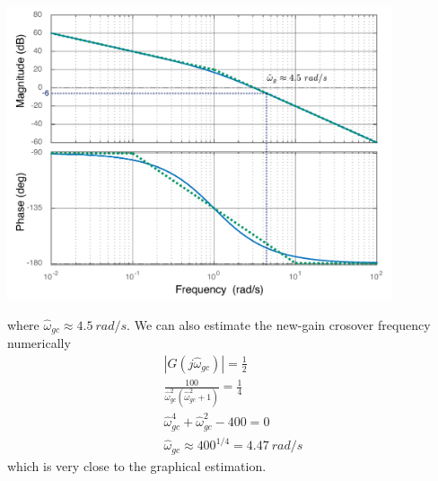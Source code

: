 \documentclass[twoside]{article}
\begin{document}
     \begin{center}
 \begin{minipage}[h]{\linewidth}
     \begin{center}
       \includegraphics[width=0.85\textwidth]{gaincros}
     \end{center}
 \end{minipage}
     \end{center}

where $\hat{\omega}_{gc} \approx 4.5 \ rad/s$.
We can also estimate the new-gain crosover frequency
numerically 
%
\begin{align*}
  |G(j \hat{\omega}_{gc})| = \frac{1}{2}
  \\
  \frac{100}{\hat{\omega}_{gc}^2 \left( \hat{\omega}_{gc}^2 + 1
  \right)} = \frac{1}{4}
  \\
  \hat{\omega}_{gc}^4 + \hat{\omega}_{gc}^2 - 400 = 0
  \\
   \hat{\omega}_{gc} \approx 400^{1/4} = 4.47 \ rad/s
\end{align*}
%
which is very close to the graphical estimation. 
\end{document}

